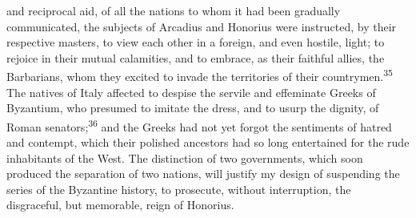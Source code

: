 and reciprocal aid, of all the nations to whom it had been
gradually communicated, the subjects of Arcadius and Honorius
were instructed, by their respective masters, to view each other
in a foreign, and even hostile, light; to rejoice in their mutual
calamities, and to embrace, as their faithful allies, the
Barbarians, whom they excited to invade the territories of their
countrymen.\textsuperscript{35} The natives of Italy affected to despise the
servile and effeminate Greeks of Byzantium, who presumed to
imitate the dress, and to usurp the dignity, of Roman senators;\textsuperscript{36}
and the Greeks had not yet forgot the sentiments of hatred and
contempt, which their polished ancestors had so long entertained
for the rude inhabitants of the West. The distinction of two
governments, which soon produced the separation of two nations,
will justify my design of suspending the series of the Byzantine
history, to prosecute, without interruption, the disgraceful, but
memorable, reign of Honorius.





